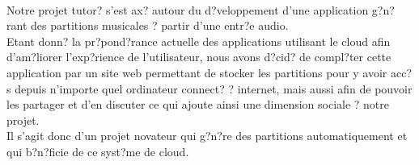 \paragraph{}
Notre projet tutor? s'est ax? autour du d?veloppement d'une application g?n?rant des partitions musicales ? partir d'une entr?e audio. \\
Etant donn? la pr?pond?rance actuelle des applications utilisant le cloud afin d'am?liorer l'exp?rience de l'utilisateur, nous avons d?cid? de compl?ter cette application par un site web permettant de stocker les partitions pour y avoir acc?s depuis n'importe quel ordinateur connect? ? internet, mais aussi afin de pouvoir les partager et d'en discuter ce qui ajoute ainsi une dimension sociale ? notre projet. \\
Il s'agit donc d'un projet novateur qui g?n?re des partitions automatiquement et qui b?n?ficie de ce  syst?me de cloud.